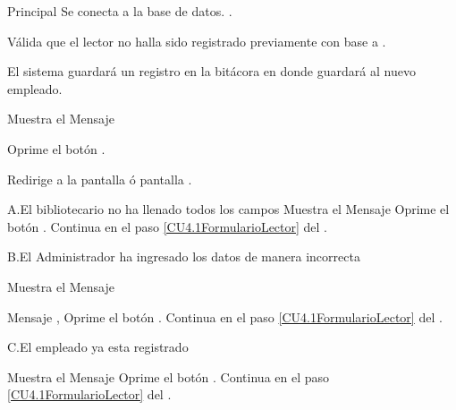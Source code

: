 \begin{UCtrayectoria}{Principal}
		\UCpaso Se conecta a la base de datos. .

		\UCpaso Válida que el lector no halla sido registrado previamente con base a  .

		\UCpaso El sistema guardará un registro en la bitácora en donde guardará al nuevo empleado.

		\UCpaso Muestra el Mensaje 

		\UCpaso[\UCactor] Oprime el botón .

		\UCpaso Redirige a la pantalla  ó pantalla .
		

	\end{UCtrayectoria}




		
		
		\begin{UCtrayectoriaA}{A.}{El bibliotecario no ha llenado todos los campos}
			\UCpaso Muestra el Mensaje 
			\UCpaso[\UCactor] Oprime el botón .
			\UCpaso Continua en el paso \ref{CU4.1FormularioLector} del .
			
		\end{UCtrayectoriaA}


		\begin{UCtrayectoriaA}{B.}{El Administrador ha ingresado los datos de manera incorrecta}

			\UCpaso Muestra el Mensaje \item Mensaje ,
			\UCpaso[\UCactor] Oprime el botón .
			\UCpaso Continua en el paso \ref{CU4.1FormularioLector} del .

		\end{UCtrayectoriaA}

		\begin{UCtrayectoriaA}{C.}{El empleado ya esta registrado}

			\UCpaso Muestra el Mensaje 
			\UCpaso[\UCactor] Oprime el botón .
			\UCpaso Continua en el paso \ref{CU4.1FormularioLector} del .

		\end{UCtrayectoriaA}


